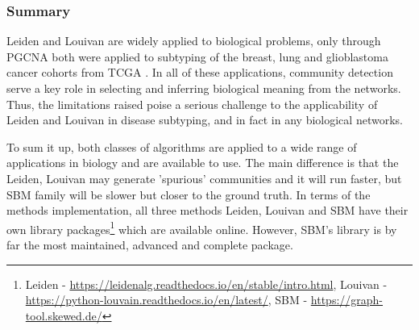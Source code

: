 \subsubsection{Summary}


Leiden and Louivan are widely applied to biological problems, only through PGCNA both were applied to subtyping of the breast, lung and glioblastoma cancer cohorts from TCGA \cite{Tanner2023-wa, Care2019-ij}. In all of these applications, community detection serve a key role in selecting and inferring biological meaning from the networks. Thus, the limitations raised \citet{Peixoto2021-jx,Guimera2004-gv, Peixoto2023-rt} poise a serious challenge to the applicability of Leiden and Louivan in disease subtyping, and in fact in any biological networks. 

To sum it up, both classes of algorithms are applied to a wide range of applications in biology and are available to use. The main difference is that the Leiden, Louivan may generate 'spurious' communities and it will run faster, but SBM family will be slower but closer to the ground truth. In terms of the methods implementation, all three methods Leiden, Louivan and SBM have their own library packages\footnote{Leiden - \url{https://leidenalg.readthedocs.io/en/stable/intro.html}, Louivan - \url{https://python-louvain.readthedocs.io/en/latest/}, SBM - \url{https://graph-tool.skewed.de/}} which are available online. However, SBM's library is by far the most maintained, advanced and complete package.






